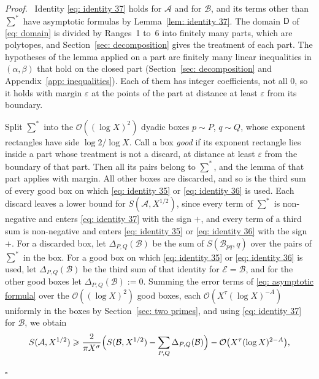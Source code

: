 \documentclass{article}
\numberwithin{equation}{section}
\newenvironment{proof}[1][Proof]{\par\medskip\noindent\textit{#1.}\ }{\hfill$\square$\par\medskip}
\newcommand{\Ge}{\geqslant}
\begin{document}
\begin{proof}
Identity \eqref{eq: identity 37} holds for $\mathcal{A}$ and for $\mathcal{B}$, and its terms other than $\sum^*$ have asymptotic formulas by Lemma~\ref{lem: identity 37}. The domain $\mathsf{D}$ of \eqref{eq: domain} is divided by Ranges~1 to~6 into finitely many parts, which are polytopes, and Section~\ref{sec: decomposition} gives the treatment of each part. The hypotheses of the lemma applied on a part are finitely many linear inequalities in $(\alpha, \beta)$ that hold on the closed part (Section~\ref{sec: decomposition} and Appendix~\ref{app: inequalities}). Each of them has integer coefficients, not all $0$, so it holds with margin $\varepsilon$ at the points of the part at distance at least $\varepsilon$ from its boundary.

Split $\sum^*$ into the $\mathcal{O}((\log X)^2)$ dyadic boxes $p \sim P$, $q \sim Q$, whose exponent rectangles have side $\log 2/\log X$. Call a box \emph{good} if its exponent rectangle lies inside a part whose treatment is not a discard, at distance at least $\varepsilon$ from the boundary of that part. Then all its pairs belong to $\sum^*$, and the lemma of that part applies with margin. All other boxes are discarded, and so is the third sum of every good box on which \eqref{eq: identity 35} or \eqref{eq: identity 36} is used. Each discard leaves a lower bound for $S(\mathcal{A}, X^{1/2})$, since every term of $\sum^*$ is non-negative and enters \eqref{eq: identity 37} with the sign $+$, and every term of a third sum is non-negative and enters \eqref{eq: identity 35} or \eqref{eq: identity 36} with the sign $+$. For a discarded box, let $\Delta_{P,Q}(\mathcal{B})$ be the sum of $S(\mathcal{B}_{pq}, q)$ over the pairs of $\sum^*$ in the box. For a good box on which \eqref{eq: identity 35} or \eqref{eq: identity 36} is used, let $\Delta_{P,Q}(\mathcal{B})$ be the third sum of that identity for $\mathcal{E} = \mathcal{B}$, and for the other good boxes let $\Delta_{P,Q}(\mathcal{B}) := 0$. Summing the error terms of \eqref{eq: asymptotic formula} over the $\mathcal{O}((\log X)^2)$ good boxes, each $\mathcal{O}(X^{\tau}(\log X)^{-A})$ uniformly in the boxes by Section~\ref{sec: two primes}, and using \eqref{eq: identity 37} for $\mathcal{B}$, we obtain
\begin{equation}
\label{eq: lower bound boxes}
S(\mathcal{A}, X^{1/2}) \Ge \frac{2}{\pi X^{\sigma}} \Bigl( S(\mathcal{B}, X^{1/2}) - \sum_{P, Q} \Delta_{P,Q}(\mathcal{B}) \Bigr) - \mathcal{O}\bigl( X^{\tau} (\log X)^{2 - A} \bigr),
\end{equation}

\end{proof}
\end{document}

